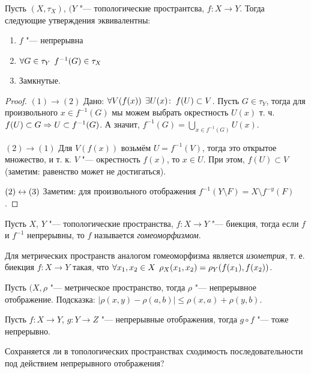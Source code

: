 \documentclass[main]{subfiles}
\begin{document}
\begin{theorem}
  Пусть \( (X, \tau_X) \), \( (Y \) "--- топологические пространтсва,
  \( f : X \to Y \). Тогда следующие утверждения
  эквивалентны:
  \begin{enumerate}
    \item \( f \) "--- непрерывна
    \item \( \forall {G \in \tau_Y} \; \, f^{-1}(G) \in \tau_X \)
    \item Замкнутые.
  \end{enumerate}
\end{theorem}
\begin{proof}
  \( (1) \to (2) \) Дано: \( \forall {V(f(x))} \; \, \exists U(x) \colon \: f(U) \subset V \).
  Пусть  \( G \in \tau_Y \), тогда для произвольного \( x \in f^{-1}(G) \)
  мы можем выбрать окрестность \( U(x) \) т. ч. \( f(U) \subset G \Rightarrow
  U \subset f^{-1}(G) \). А значит,
  \( f^{-1}(G) = \bigcup_{x \in f^{-1}(G)} U(x) \).

  \( (2) \to (1) \) Для \( V(f(x)) \) возьмём \( U = f^{-1}(V) \),
  тогда это открытое множество, и т. к. \( V \) "--- окрестность \( f(x) \),
  то \( x \in U \). При этом, \( f(U) \subset V \) 
  (заметим: равенство может не достигаться).

  \( (2) \leftrightarrow (3) \) Заметим: для произвольного отображения
  \( f^{-1}(Y \setminus F) = X \setminus f^{-y}(F) \).
\end{proof}

\begin{definition}
  Пусть \( X \), \( Y \) "--- топологические пространства,
  \( f : X \to Y \) "--- биекция, тогда если \( f \) и \( f^{-1} \)
  непрерывны, то \( f \) называется \emph{гомеоморфизмом}.
\end{definition}

\begin{remark}
  Для метрических пространств аналогом гомеоморфизма является
  \emph{изометрия}, т. е. биекция \( f : X \to Y \) такая,
  что \( \forall {x_1, x_2 \in X} \; \, \rho_X(x_1, x_2) = 
  \rho_Y(f(x_1), f(x_2)) \).
\end{remark}

\begin{exercise}
  Пусть \( (X, \rho \) "--- метрическое пространство,
  тогда \( \rho \) "--- непрерывное отображение.
  Подсказка: \( |\rho(x, y) - \rho(a, b)| \le
  \rho(x, a) + \rho(y, b) \).
\end{exercise}

\begin{exercise}
  Пусть \( f : X \to Y \), \( g : Y \to Z \) "--- непрерывные
  отображения, тогда \( g \circ f \) "--- тоже непрерывно.
\end{exercise}
\begin{exercise}
  Сохраняется ли в топологических пространствах сходимость
  последовательности под действием непрерывного отображения?
\end{exercise}
\end{document}
